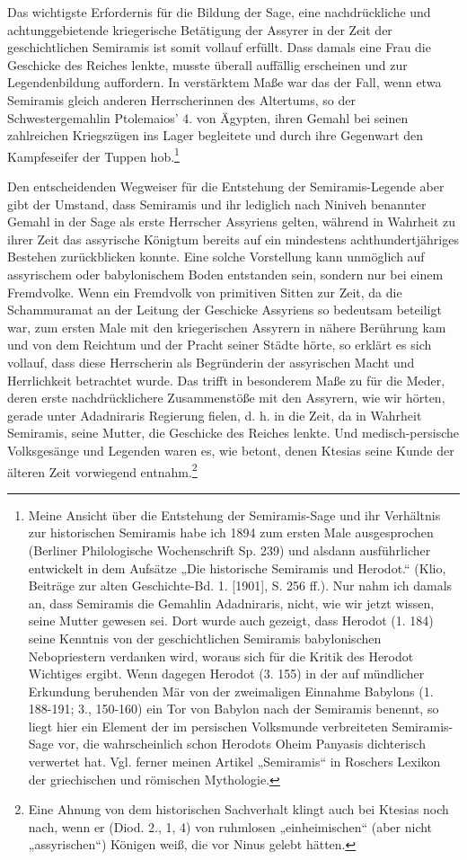 \documentclass[a4paper, 11pt, oneside, polutonikogreek, german]{article}
\begin{document}
Das wichtigste Erfordernis für die Bildung der Sage, eine nachdrückliche und achtunggebietende kriegerische Betätigung der Assyrer in der Zeit der geschichtlichen Semiramis ist somit vollauf erfüllt. Dass damals eine Frau die Geschicke des Reiches lenkte, musste überall auffällig erscheinen und zur Legendenbildung auffordern. In verstärktem Maße war das der Fall, wenn etwa Semiramis gleich anderen Herrscherinnen des Altertums, so der Schwestergemahlin Ptolemaios' 4. von Ägypten, ihren Gemahl bei seinen zahlreichen Kriegszügen ins Lager begleitete und durch ihre Gegenwart den Kampfeseifer der Tuppen hob.\footnote{Meine Ansicht über die Entstehung der Semiramis-Sage und ihr Verhältnis zur historischen Semiramis habe ich 1894 zum ersten Male ausgesprochen (Berliner Philologische Wochenschrift Sp. 239) und alsdann ausführlicher entwickelt in dem Aufsätze „Die historische Semiramis und Herodot.“ (Klio, Beiträge zur alten Geschichte-Bd. 1. [1901], S. 256 ff.). Nur nahm ich damals an, dass Semiramis die Gemahlin Adadniraris, nicht, wie wir jetzt wissen, seine Mutter gewesen sei. Dort wurde auch gezeigt, dass Herodot (1. 184) seine Kenntnis von der geschichtlichen Semiramis babylonischen Nebopriestern verdanken wird, woraus sich für die Kritik des Herodot Wichtiges ergibt. Wenn dagegen Herodot (3. 155) in der auf mündlicher Erkundung beruhenden Mär von der zweimaligen Einnahme Babylons (1. 188-191; 3., 150-160) ein Tor von Babylon nach der Semiramis benennt, so liegt hier ein Element der im persischen Volksmunde verbreiteten Semiramis-Sage vor, die wahrscheinlich schon Herodots Oheim Panyasis dichterisch verwertet hat. Vgl. ferner meinen Artikel „Semiramis“ in Roschers Lexikon der griechischen und römischen Mythologie.}

Den entscheidenden Wegweiser für die Entstehung der Semiramis-Legende aber gibt der Umstand, dass Semiramis und ihr lediglich nach Niniveh benannter Gemahl in der Sage als erste Herrscher Assyriens gelten, während in Wahrheit zu ihrer Zeit das assyrische Königtum bereits auf ein mindestens achthundertjähriges Bestehen zurückblicken konnte. Eine solche Vorstellung kann unmöglich auf assyrischem oder babylonischem Boden entstanden sein, sondern nur bei einem Fremdvolke. Wenn ein Fremdvolk von primitiven Sitten zur Zeit, da die Schammuramat an der Leitung der Geschicke Assyriens so bedeutsam beteiligt war, zum ersten Male mit den kriegerischen Assyrern in nähere Berührung kam und von dem Reichtum und der Pracht seiner Städte hörte, so erklärt es sich vollauf, dass diese Herrscherin als Begründerin der assyrischen Macht und Herrlichkeit betrachtet wurde. Das trifft in besonderem Maße zu für die Meder, deren erste nachdrücklichere Zusammenstöße mit den Assyrern, wie wir hörten, gerade unter Adadniraris Regierung fielen, d. h. in die Zeit, da in Wahrheit Semiramis, seine Mutter, die Geschicke des Reiches lenkte. Und medisch-persische Volksgesänge und Legenden waren es, wie betont, denen Ktesias seine Kunde der älteren Zeit vorwiegend entnahm.\footnote{Eine Ahnung von dem historischen Sachverhalt klingt auch bei Ktesias noch nach, wenn er (Diod. 2., 1, 4) von ruhmlosen „einheimischen“ (aber nicht „assyrischen“) Königen weiß, die vor Ninus gelebt hätten.}
\end{document}
